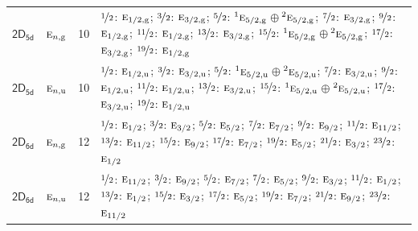 \documentclass[10pt,a4paper]{article}
\numberwithin{equation}{section}
\newcommand{\grp}[1]{\mathsf{#1}}
\newcommand{\irr}[1]{\text{\normalfont\scshape #1}}
\newcommand{\conjpair}[1]{{}^{#1}}
\newcommand{\ptag}[1]{\mathrm{#1}}
\newlength{\fillwidth}\newlength{\cellwidth}\newlength{\colwidth}
\begin{document}
{\begin{longtable}{@{}llr>{\RaggedRight\arraybackslash}p{\fillwidth}@{}}
\href{2D5d.pdf}{$\grp{2D_{5d}}$} & $\irr{e}_{n,\ptag{g}}$ & 10 & $\nicefrac{1}{2}$: $\irr{e}_{1/2,\ptag{g}}$; $\nicefrac{3}{2}$: $\irr{e}_{3/2,\ptag{g}}$; $\nicefrac{5}{2}$: $\conjpair{1}\irr{e}_{5/2,\ptag{g}}$${}\oplus{}$$\conjpair{2}\irr{e}_{5/2,\ptag{g}}$; $\nicefrac{7}{2}$: $\irr{e}_{3/2,\ptag{g}}$; $\nicefrac{9}{2}$: $\irr{e}_{1/2,\ptag{g}}$; $\nicefrac{11}{2}$: $\irr{e}_{1/2,\ptag{g}}$; $\nicefrac{13}{2}$: $\irr{e}_{3/2,\ptag{g}}$; $\nicefrac{15}{2}$: $\conjpair{1}\irr{e}_{5/2,\ptag{g}}$${}\oplus{}$$\conjpair{2}\irr{e}_{5/2,\ptag{g}}$; $\nicefrac{17}{2}$: $\irr{e}_{3/2,\ptag{g}}$; $\nicefrac{19}{2}$: $\irr{e}_{1/2,\ptag{g}}$\\
\href{2D5d.pdf}{$\grp{2D_{5d}}$} & $\irr{e}_{n,\ptag{u}}$ & 10 & $\nicefrac{1}{2}$: $\irr{e}_{1/2,\ptag{u}}$; $\nicefrac{3}{2}$: $\irr{e}_{3/2,\ptag{u}}$; $\nicefrac{5}{2}$: $\conjpair{1}\irr{e}_{5/2,\ptag{u}}$${}\oplus{}$$\conjpair{2}\irr{e}_{5/2,\ptag{u}}$; $\nicefrac{7}{2}$: $\irr{e}_{3/2,\ptag{u}}$; $\nicefrac{9}{2}$: $\irr{e}_{1/2,\ptag{u}}$; $\nicefrac{11}{2}$: $\irr{e}_{1/2,\ptag{u}}$; $\nicefrac{13}{2}$: $\irr{e}_{3/2,\ptag{u}}$; $\nicefrac{15}{2}$: $\conjpair{1}\irr{e}_{5/2,\ptag{u}}$${}\oplus{}$$\conjpair{2}\irr{e}_{5/2,\ptag{u}}$; $\nicefrac{17}{2}$: $\irr{e}_{3/2,\ptag{u}}$; $\nicefrac{19}{2}$: $\irr{e}_{1/2,\ptag{u}}$\\
\href{2D6d.pdf}{$\grp{2D_{6d}}$} & $\irr{e}_{n,\ptag{g}}$ & 12 & $\nicefrac{1}{2}$: $\irr{e}_{1/2}$; $\nicefrac{3}{2}$: $\irr{e}_{3/2}$; $\nicefrac{5}{2}$: $\irr{e}_{5/2}$; $\nicefrac{7}{2}$: $\irr{e}_{7/2}$; $\nicefrac{9}{2}$: $\irr{e}_{9/2}$; $\nicefrac{11}{2}$: $\irr{e}_{11/2}$; $\nicefrac{13}{2}$: $\irr{e}_{11/2}$; $\nicefrac{15}{2}$: $\irr{e}_{9/2}$; $\nicefrac{17}{2}$: $\irr{e}_{7/2}$; $\nicefrac{19}{2}$: $\irr{e}_{5/2}$; $\nicefrac{21}{2}$: $\irr{e}_{3/2}$; $\nicefrac{23}{2}$: $\irr{e}_{1/2}$\\
\href{2D6d.pdf}{$\grp{2D_{6d}}$} & $\irr{e}_{n,\ptag{u}}$ & 12 & $\nicefrac{1}{2}$: $\irr{e}_{11/2}$; $\nicefrac{3}{2}$: $\irr{e}_{9/2}$; $\nicefrac{5}{2}$: $\irr{e}_{7/2}$; $\nicefrac{7}{2}$: $\irr{e}_{5/2}$; $\nicefrac{9}{2}$: $\irr{e}_{3/2}$; $\nicefrac{11}{2}$: $\irr{e}_{1/2}$; $\nicefrac{13}{2}$: $\irr{e}_{1/2}$; $\nicefrac{15}{2}$: $\irr{e}_{3/2}$; $\nicefrac{17}{2}$: $\irr{e}_{5/2}$; $\nicefrac{19}{2}$: $\irr{e}_{7/2}$; $\nicefrac{21}{2}$: $\irr{e}_{9/2}$; $\nicefrac{23}{2}$: $\irr{e}_{11/2}$\\

\end{longtable}}
\end{document}
